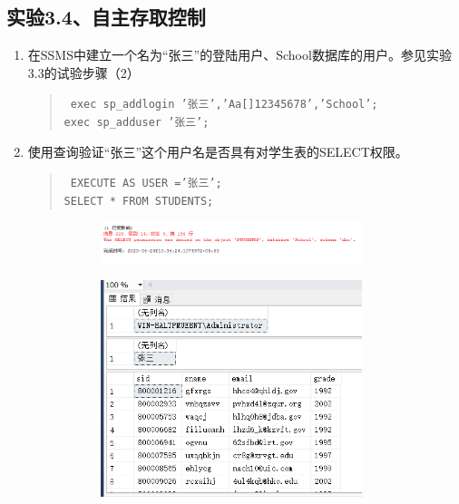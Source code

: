 \documentclass[a4paper,twoside]{article}
\begin{document}
\begin{spacing}{1.2}
\section{实验3.4、自主存取控制}

\begin{enumerate}
  \item	在SSMS中建立一个名为“张三”的登陆用户、School数据库的用户。参见实验3.3的试验步骤（2）
  \begin{quote}
    \texttt{
      exec sp\_addlogin '张三','Aa[]12345678','School';\\
exec sp\_adduser  '张三';\\
    }
  \end{quote}
  \item	使用查询验证“张三”这个用户名是否具有对学生表的SELECT权限。
  \begin{quote}
    \texttt{
EXECUTE AS USER ='张三';\\
SELECT  * FROM  STUDENTS;\\
    }
  \end{quote}

  \begin{figure}[htb]
    \centering
    \begin{subfigure}{0.4\textwidth}
      \centering
      \includegraphics[width=0.9\textwidth]{14.png}
    \end{subfigure}
    \begin{subfigure}{0.4\textwidth}
      \centering
      \includegraphics[width=0.9\textwidth]{15.png}
    \end{subfigure}
  \end{figure}


\end{enumerate}
\end{spacing}
\end{document}
